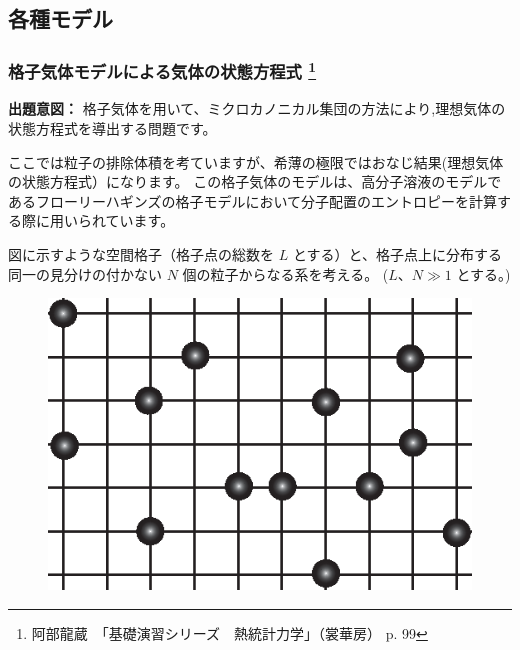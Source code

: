 \documentclass[uplatex,dvipdfmx,a4paper,11pt]{jsarticle}
\begin{document}
\subsection{各種モデル}


\subsubsection[格子気体モデルによる気体の状態方程式]{格子気体モデルによる気体の状態方程式
\footnote{阿部龍蔵　「基礎演習シリーズ　熱統計力学」（裳華房） p. 99}
}

\begin{boxnote}
{\bf 出題意図：}
格子気体を用いて、ミクロカノニカル集団の方法により,理想気体の状態方程式を導出する問題です。

ここでは粒子の排除体積を考ていますが、希薄の極限ではおなじ結果(理想気体の状態方程式）になります。
この格子気体のモデルは、高分子溶液のモデルであるフローリーハギンズの格子モデルにおいて分子配置のエントロピーを計算する際に用いられています。
\end{boxnote}
\vspace{8pt}

図に示すような空間格子（格子点の総数を $L$ とする）と、格子点上に分布する同一の見分けの付かない $N$ 個の粒子からなる系を考える。
($L$、$N \gg 1$ とする。) 
%
\begin{figure}[h]
  \begin{center}
    \includegraphics{./figures/FIG_LatticeModel.eps}
  \end{center}
\end{figure}
%
\end{document}
